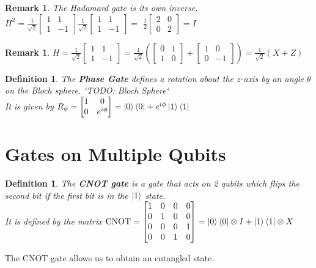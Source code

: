 \documentclass[12pt,twoside]{report}
\newtheorem{defn}[subsection]{Definition}
\newtheorem{remark}[subsection]{Remark}
\begin{document}
\begin{remark}
    The Hadamard gate is its own inverse.\\
    $H^2 = \frac{1}{\sqrt{2}} \begin{bmatrix} 1 & 1 \\ 1 & -1 \end{bmatrix} \frac{1}{\sqrt{2}} \begin{bmatrix} 1 & 1 \\ 1 & -1 \end{bmatrix} = $
    $\frac{1}{2} \begin{bmatrix}2 & 0 \\ 0 & 2 \end{bmatrix} = I$
\end{remark}
\begin{remark}
    $H =   \frac{1}{\sqrt{2}} \begin{bmatrix} 1 & 1 \\ 1 & -1 \end{bmatrix} = \frac{1}{\sqrt{2}} \left( \begin{bmatrix} 0 & 1 \\ 1 & 0 \end{bmatrix}  + \begin{bmatrix} 1 & 0 \\ 0 & -1 \end{bmatrix} \right) = \frac{1}{\sqrt{2}} (X + Z)$
\end{remark}

\begin{defn}
    The \textbf{Phase Gate} defines a rotation about the $z$-axis by an angle $\theta$ on the Bloch sphere. `TODO: Bloch Sphere`\\
    It is given by $R_\phi = \begin{bmatrix} 1 & 0 \\ 0 & e^{i\phi} \end{bmatrix} = \ket{0}\bra{0} + e^{i\phi} \ket{1}\bra{1}$
\end{defn}

\section{Gates on Multiple Qubits}

\begin{defn}
    The \textbf{CNOT gate} is a gate that acts on 2 qubits which flips the second bit if the first bit is in the $\ket{1}$ state.\\
    It is defined by the matrix $\text{CNOT} = \begin{bmatrix} 1 & 0 & 0 & 0 \\ 0 & 1 & 0 & 0 \\ 0 & 0 & 0 & 1 \\ 0 & 0 & 1 & 0 \end{bmatrix} = \ket{0}\bra{0} \otimes I + \ket{1}\bra{1} \otimes X$
\end{defn}
The CNOT gate allows us to obtain an entangled state.
\end{document}
